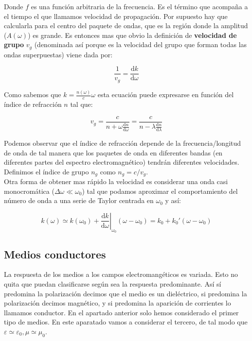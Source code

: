 \documentclass[12pt]{article}
\newcommand{\D}{\mathrm{d}}
\numberwithin{equation}{section}
\numberwithin{figure}{section}
\begin{document}
Donde $f$ es una función arbitraria de la frecuencia. Es el término que acompaña a el tiempo el que llamamos velocidad de propagación. Por supuesto hay que calcularla para el centro del paquete de ondas, que es la región donde la amplitud ($A(\omega)$) es grande. Es entonces mas que obvio la definición de \textbf{velocidad de grupo} $v_g$ (denominada así porque es la velocidad del grupo que forman todas las ondas superpuestas) viene dada por:

\begin{equation}
\dfrac{1}{v_g} = \dfrac{\D k}{\D \omega}
\end{equation}

Como sabemos que $k = \frac{n(\omega)}{c} \omega$ esta ecuación puede expresarse en función del índice de refracción $n$ tal que:

\begin{equation}
v_g = \dfrac{c}{n+\omega \frac{\D n}{\D \omega}} = \dfrac{c}{n - \lambda \frac{\D n}{\D \lambda}}
\end{equation}

Podemos observar que el índice de refracción depende de la frecuencia/longitud de onda de tal manera que los paquetes de onda en diferentes bandas (en diferentes partes del espectro electromagnético) tendrán diferentes velocidades. Definimos el índice de grupo $n_g$ como $n_g = c / v_g$. \\


Otra forma de obtener mas rápido la velocidad es considerar una onda casi monocromática ($\Delta \omega \ll \omega_0$) tal que podamos aproximar el comportamiento del número de onda a una serie de Taylor centrada en $\omega_0$ y así:

\begin{equation}
k(\omega) \simeq k(\omega_0) +  \left. \dfrac{\D k}{\D \omega} \right|_{\omega_0} (\omega-\omega_0) = k_0 + k_0' (\omega - \omega_0)
\end{equation} 

\subsection{Medios conductores}

La respuesta de los medios a los campos electromangéticos es variada. Esto no quita que puedan clasificarse según sea la respuesta predominante. Así sí predomina la polarización decimos que el medio es un dieléctrico, si predomina la polarización decimos magnético, y si predomina la aparición de corrientes lo llamamos conductor. En el apartado anterior solo hemos considerado el primer tipo de medios. En este aparatado vamos a considerar el tercero, de tal modo que $\varepsilon \simeq \varepsilon_0, \mu \simeq \mu_0$.
\end{document}
